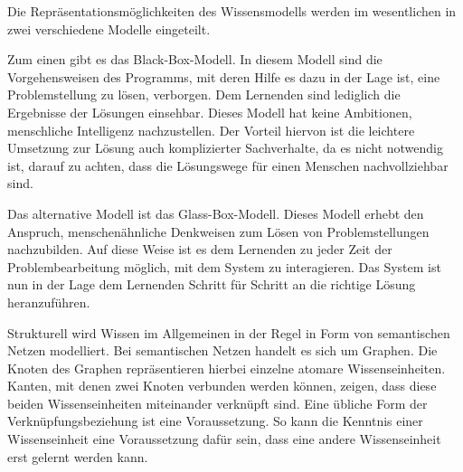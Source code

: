 Die Repräsentationsmöglichkeiten des Wissensmodells werden im wesentlichen in zwei verschiedene
Modelle eingeteilt.

Zum einen gibt es das \glqq Black-Box-Modell\grqq .
In diesem Modell sind die Vorgehensweisen des Programms, mit deren Hilfe es dazu
in der Lage ist, eine Problemstellung zu lösen, verborgen. Dem Lernenden sind lediglich
die Ergebnisse der Lösungen einsehbar. Dieses Modell hat keine Ambitionen, menschliche
Intelligenz nachzustellen. Der Vorteil hiervon ist die leichtere Umsetzung zur Lösung
auch komplizierter Sachverhalte, da es nicht notwendig ist, darauf zu achten, dass die
Lösungswege für einen Menschen nachvollziehbar sind.

Das alternative Modell ist das \glqq Glass-Box-Modell\grqq .
Dieses Modell erhebt den Anspruch, menschenähnliche Denkweisen zum Lösen von
Problemstellungen nachzubilden. Auf diese Weise ist es dem Lernenden zu jeder Zeit der
Problembearbeitung möglich, mit dem System zu interagieren. Das System ist nun in der Lage
dem Lernenden Schritt für Schritt an die richtige Lösung heranzuführen.

Strukturell wird Wissen im Allgemeinen in der Regel in Form von semantischen Netzen modelliert.
Bei semantischen Netzen handelt es sich um Graphen. Die Knoten des Graphen repräsentieren
hierbei einzelne atomare Wissenseinheiten. Kanten, mit denen zwei Knoten verbunden werden können,
zeigen, dass diese beiden Wissenseinheiten miteinander verknüpft sind.
Eine übliche Form der Verknüpfungsbeziehung ist eine Voraussetzung.
So kann die Kenntnis einer Wissenseinheit eine Voraussetzung dafür sein,
dass eine andere Wissenseinheit erst gelernt werden kann.

